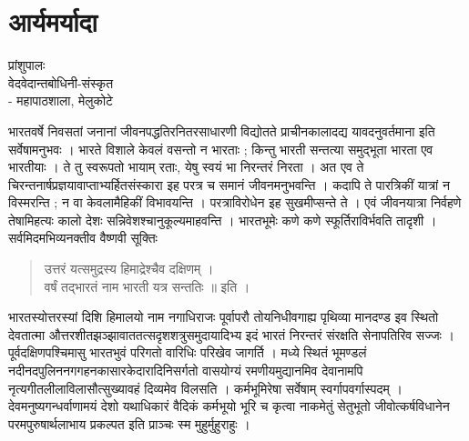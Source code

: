 \chapter{आर्यमर्यादा}

\begin{center}
\smallskip

प्रांशुपालः\\
वेदवेदान्तबोधिनी-संस्कृत\\
- महापाठशाला, मेलुकोटे
\addrule
\end{center}

भारतवर्षे निवसतां जनानां जीवनपद्धतिरनितरसाधारणी विद्योतते प्राचीनकालादद्य यावदनुवर्तमाना इति सर्वेषामनुभवः । भारते विशाले केवलं वसन्तो न भारताः ; किन्तु भारती सन्तत्या समुद्भूता भारता एव भारतीयाः । ते तु स्वरूपतो भायाम् रताः, येषु स्वयं भा निरन्तरं निरता । अत एव ते चिरन्तनार्षप्रज्ञयावाप्ताभ्यर्हितसंस्कारा इह परत्र च समानं जीवनमनुभवन्ति । कदापि ते पारत्रिकीं यात्रां न विस्मरन्ति ; न वा केवलामैहिकीं विभावयन्ति । परत्राविरोधेन इह सुखमीप्सन्ते ते । एवं जीवनयात्रा निर्वहणे तेषामिहत्यः कालो देशः सन्निवेशश्चानुकूल्यमाहवन्ति । भारतभूमेः कणे कणे स्फूर्तिराविर्भवति तादृशी । सर्वमिदमभिव्यनक्तीव वैष्णवी सूक्तिः 
\begin{verse}
उत्तरं यत्समुद्रस्य हिमाद्रेश्चैव दक्षिणम् ।\\
वर्षं तद्भारतं नाम भारती यत्र सन्ततिः ॥ इति ।
\end{verse}
भारतस्योत्तरस्यां दिशि हिमालयो नाम नगाधिराजः पूर्वापरौ तोयनिधीवगाह्य पृथिव्या मानदण्ड इव स्थितो देवतात्मा औत्तरशीतझञ्झावाततत्सदृशशत्रुसमुदायादिभ्य इदं भारतं निरन्तरं संरक्षति सेनापतिरिव सज्जः । पूर्वदक्षिणपश्चिमासु भारतभुवं परिगतो वारिधिः परिखेव जागर्ति । मध्ये स्थितं  भूमण्डलं नदीनदपुलिननगगहनकासारकेदारादिनिसर्गतो वासयोग्यं रमणीयमुद्यानमिव देवानामपि नृत्यगीतलीलाविलासौत्सुख्यावहं दिव्यमेव विलसति । कर्मभूमिरेषा सर्वेषाम् स्वर्गापवर्गास्पदम् । देवमनुष्यगन्धर्वाणामयं देशो यथाधिकारं वैदिकं कर्मभूयो भूरि च कृत्वा नाकमेतुं सेतुभूतो जीवोत्कर्षविधानेन परमपुरुषार्थलाभाय प्रकल्पत इति प्राञ्चः स्म मुहुर्मुहुराहुः ।

